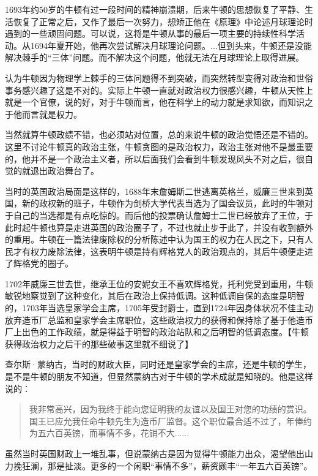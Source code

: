 \documentclass[12pt,oneside]{book}
\begin{document}
\begin{bookref}[frametitle={\cite{牛顿新传}}]
1693年约50岁的牛顿有过一段时间的精神崩溃期，后来牛顿的思想恢复了平静、生活恢复了正常之后，又作了最后一次努力，想矫正他在《原理》中论述月球理论时遇到的一些顽固问题。可以说，这将是牛顿从事的最后一项主要的持续性科学活动。从1694年夏开始，他再次尝试解决月球理论问题。...但到头来，牛顿还是没能解决棘手的“三体”问题。而不解决这个问题，他就无法在月球理论上取得进展。
\end{bookref}


认为牛顿因为物理学上棘手的三体问题得不到突破，而突然转型变得对政治和世俗事务感兴趣了这是不对的。实际上牛顿一直就对政治权力很感兴趣，牛顿从天性上就是一个官僚，\cite{牛顿传}说的好，对于牛顿而言，他在科学上的动力就是求知欲，而知识之于他而言就是权力。

当然就算牛顿政绩不错，也必须站对位置，总的来说牛顿的政治觉悟还是不错的。这里不讨论牛顿真的政治主张，牛顿贪图的是政治权力，政治主张对他不是最重要的，他并不是一个政治主义者，所以后面我们会看到牛顿发现风头不对之后，很自觉的就退出政治舞台了。

当时的英国政治局面是这样的，1688年末詹姆斯二世逃离英格兰，威廉三世来到英国，新的政权新的班子，牛顿作为剑桥大学代表当选为了国会议员，此时的牛顿对于自己的当选都是有点吃惊的。而后他的投票确认詹姆士二世已经放弃了王位，于此时起牛顿也算是走进英国的政治圈子了，不过也就止步于此了，并没有收到额外的重用。牛顿在一篇法律废除权的分析陈述中认为国王的权力在人民之下，只有人民才有权力废除法律，这表明牛顿是持有辉格党人的政治观点的，其后牛顿便走进了辉格党的圈子。

1702年威廉三世去世，继承王位的安妮女王不喜欢辉格党，托利党受到重用，牛顿敏锐地察觉到了这种变化，其后在政治上保持低调。这种低调自保的态度是明智的，1703年当选皇家学会主席，1705年受封爵士，直到1724年因身体状况不佳主动放弃造币厂总监和皇家学会主席职位，这些政治权力的获得和保持除了基于他造币厂上出色的工作政绩，就是得益于明智的政治站队和之后明智的低调态度。【牛顿获得政治权力之后干的那些破事这里就不细说了】

查尔斯·蒙纳古，当时的财政大臣，同时还是皇家学会的主席，还是牛顿的学生，是不是牛顿的朋友不知道，但显然蒙纳古对于牛顿的学术成就是知晓的。他是这样说的：

\begin{quotation}
我非常高兴，因为我终于能向您证明我的友谊以及国王对您的功绩的赏识。国王已应允我任命牛顿先生为造币厂监督。这个职位最合适不过了，年俸约为五六百英镑，而事情不多，花销不大......
\end{quotation}

虽然当时英国财政上一堆乱事，但说蒙纳古是因为觉得牛顿能力出众，渴望他出山力挽狂澜，那是扯淡。更多的一个闲职“事情不多”，薪资颇丰“一年五六百英镑”。
\end{document}
